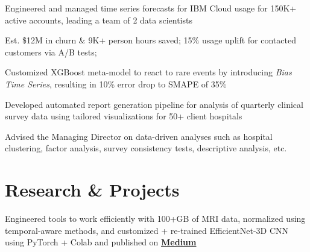 \documentclass[]{deedy-resume-openfont}
\begin{document}
\begin{minipage}[t]{0.66\textwidth}
\begin{tightemize}
\item Engineered and managed time series forecasts for IBM Cloud usage for 150K+ active accounts, leading a team of 2 data scientists
    \begin{tightemize}
    \vspace{\topsep} %
    \item Est. \$12M in churn \& 9K+ person hours saved; 15\% usage uplift for contacted customers via A/B tests; 
    \end{tightemize}  
\vspace{\topsep} 
\item Customized XGBoost meta-model to react to rare events by introducing \textit{Bias Time Series}, resulting in 10\% error drop to SMAPE of 35\%
\end{tightemize}
\sectionsep

\begin{tightemize}
\item Developed automated report generation pipeline for analysis of quarterly clinical survey data using tailored visualizations for 50+ client hospitals
\item Advised the Managing Director on data-driven analyses such as hospital clustering, factor analysis, survey consistency tests, descriptive analysis, etc.
\end{tightemize}
\sectionsep


\section{Research \& Projects}

Engineered tools to work efficiently with 100+GB of MRI data, normalized using temporal-aware methods, and customized + re-trained EfficientNet-3D CNN using PyTorch + Colab and published on \href{https://by-tg.medium.com/how-i-took-part-in-kaggles-brain-tumor-detection-competition-with-drive-colab-opensource-10-8ed90c1df8fc}{\bf Medium}
\sectionsep


\end{minipage}
\end{document}
